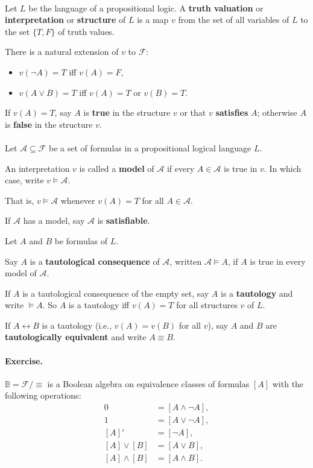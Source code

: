 \documentclass[12pt]{article}
\newlength{\myparskip}
\newenvironment{fullbox}{\begin{lrbox}{\savefullbox}\begin{minipage}{\dimexpr\textwidth-2\fboxsep\relax}\setlength{\parskip}{\myparskip}}{\end{minipage}\end{lrbox}\framebox[\textwidth]{\usebox{\savefullbox}}}
\newenvironment{pbox}[1][]{\begin{fullbox}\def\temp{#1}\ifx\temp\empty\else\paragraph{#1}\phantom{}\fi}{\end{fullbox}}
\theoremstyle{definition}
\newcommand{\<}{\langle}
\renewcommand{\>}{\rangle}
\newcommand{\seq}{\subseteq}
\renewcommand{\AA}{\mathcal{A}}
\newcommand{\FF}{\mathcal{F}}
\newcommand{\keyword}{\textbf}
\newcommand{\liff}{\leftrightarrow}
\begin{document}
\begin{pbox}
    Let $L$ be the language of a propositional logic.
    A \keyword{truth valuation} or \keyword{interpretation} or \keyword{structure} of $L$ is a map $v$ from the set of all variables of $L$ to the set $\{T, F\}$ of truth values.

    There is a natural extension of $v$ to $\FF$:
    \begin{itemize}
        \item $v(\lnot A) = T$ iff $v(A) = F$,
        \item $v(A \lor B) = T$ iff $v(A) = T$ or $v(B) = T$.
    \end{itemize}

    If $v(A) = T$, say $A$ is \keyword{true} in the structure $v$ or that $v$ \keyword{satisfies} $A$; otherwise $A$ is \keyword{false} in the structure $v$.
\end{pbox}

\begin{pbox}
    Let $\AA \seq \FF$ be a set of formulas in a propositional logical language $L$.

    An interpretation $v$ is called a \keyword{model} of $\AA$ if every $A \in \AA$ is true in $v$.
    In which case, write $v \vDash \AA$.

    That is, $v \vDash \AA$ whenever $v(A) = T$ for all $A \in \AA$.

    If $\AA$ has a model, say $\AA$ is \keyword{satisfiable}.

    Let $A$ and $B$ be formulas of $L$.

    Say $A$ is a \keyword{tautological consequence} of $\AA$, written $\AA \vDash A$, if $A$ is true in every model of $\AA$.

    If $A$ is a tautological consequence of the empty set, say $A$ is a \keyword{tautology} and write $\vDash A$.
    So $A$ is a tautology iff $v(A) = T$ for all structures $v$ of $L$.

    If $A \liff B$ is a tautology (i.e., $v(A) = v(B)$ for all $v$), say $A$ and $B$ are \keyword{tautologically equivalent} and write $A \equiv B$.
\end{pbox}


\begin{pbox}[Exercise.]
    $\mathbb{B} = \FF/\equiv$ is a Boolean algebra on equivalence classes of formulas $[A]$ with the following operations:
    \begin{align*}
        0 &= [A \land \lnot A], \\
        1 &= [A \lor \lnot A], \\
        [A]' &= [\lnot A], \\
        [A] \lor [B] &= [A \lor B], \\
        [A] \land [B] &= [A \land B].
    \end{align*}
\end{pbox}
\end{document}
